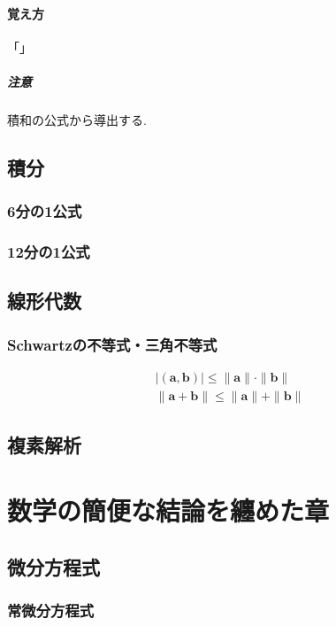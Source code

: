 \documentclass[]{jreport}
\begin{document}
\subsection{覚え方}
「」
\subsubsection{注意}
積和の公式から導出する.

\chapter{積分}
\section{6分の1公式}

\section{12分の1公式}

\chapter{線形代数}
\section{Schwartzの不等式・三角不等式}
\begin{equation}
    \begin{array}{l}
        |(\bm{a}, \bm{b})|\le\|\bm{a}\|\cdot\|\bm{b}\|\\
        \|\bm{a}+\bm{b}\|\le\|\bm{a}\|+\|\bm{b}\|
    \end{array}
\end{equation}

\chapter{複素解析}

\part{数学の簡便な結論を纏めた章}
\chapter{微分方程式}
\section{常微分方程式}
\end{document}
